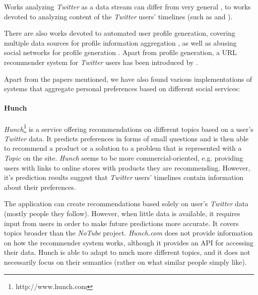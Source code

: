 Works analyzing \textit{Twitter} as a data stream can differ from very general \cite{why-we-twitter},
to works devoted to analyzing content of the \textit{Twitter} users' timelines (such as \cite{twitter-content-is-it} and \cite{short-tweet}).

There are also works devoted to automated user profile generation, covering multiple data sources for profile
information aggregation \cite{public-profiles}, as well as abusing social networks for profile generation \cite{twitter-abuse}. Apart from profile generation, a URL recommender system for \textit{Twitter} users
has been introduced by \cite{short-tweet}.

Apart from the papers mentioned, we have also found various implementations of systems that aggregate personal preferences based on different
social services:

\paragraph{Hunch}
\textit{Hunch}\footnote{http://www.hunch.com} is a service offering recommendations on different topics based on a user's \textit{Twitter} data. It predicts preferences in forms of small questions and is then able to recommend a product or a solution to a problem that is represented with a \textit{Topic} on the site. \textit{Hunch} seems to be more commercial-oriented, e.g. providing users with links to online stores with products they are recommending. However,
it's prediction results suggest that \textit{Twitter} users' timelines contain information about their preferences.

The application can create recommendations based solely on user's \textit{Twitter} data (mostly people they follow). However, when little data is available, it requires input from users in order to make future predictions more accurate. It covers topics broader than the \textit{NoTube} project.
\textit{Hunch.com} does not provide information on how the recommender system works, although it provides an API for accessing their data.
Hunch is able to adapt to much more different topics, and it does not necessarily focus on their semantics (rather on what similar people simply like).